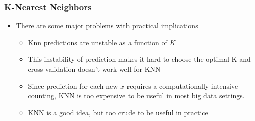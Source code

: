 \documentclass[
  shownotes,
  xcolor={svgnames},
  hyperref={colorlinks,citecolor=DarkBlue,linkcolor=andesred,urlcolor=DarkBlue}
  , aspectratio=169]{beamer}
\begin{document}
\begin{frame}[fragile]
\frametitle{K-Nearest Neighbors}
\begin{itemize}

  \item There are some major problems with practical implications
  \begin{itemize}
  \item Knn predictions are unstable as a function of $K$
  \medskip
  \item This instability of prediction makes it hard to choose the optimal K and cross validation doesn't work well for KNN
  \medskip
  \item Since prediction for each new $x$ requires a computationally intensive counting, KNN is too expensive to be useful in most big data settings.
  \medskip
  \item KNN is a good idea, but too crude to be useful in practice
  \end{itemize}
\end{itemize}

 \end{frame}

\end{document}

